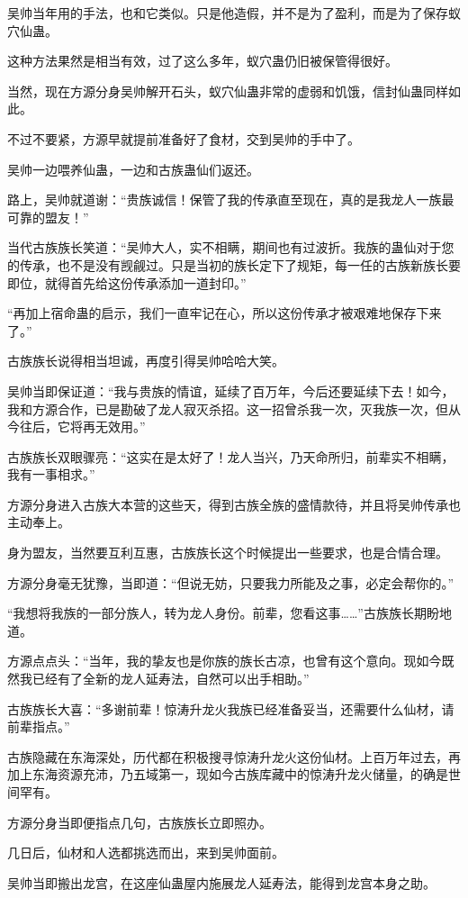 \begin{this_body}
吴帅当年用的手法，也和它类似。只是他造假，并不是为了盈利，而是为了保存蚁穴仙蛊。

这种方法果然是相当有效，过了这么多年，蚁穴蛊仍旧被保管得很好。

当然，现在方源分身吴帅解开石头，蚁穴仙蛊非常的虚弱和饥饿，信封仙蛊同样如此。

不过不要紧，方源早就提前准备好了食材，交到吴帅的手中了。

吴帅一边喂养仙蛊，一边和古族蛊仙们返还。

路上，吴帅就道谢：“贵族诚信！保管了我的传承直至现在，真的是我龙人一族最可靠的盟友！”

当代古族族长笑道：“吴帅大人，实不相瞒，期间也有过波折。我族的蛊仙对于您的传承，也不是没有觊觎过。只是当初的族长定下了规矩，每一任的古族新族长要即位，就得首先给这份传承添加一道封印。”

“再加上宿命蛊的启示，我们一直牢记在心，所以这份传承才被艰难地保存下来了。”

古族族长说得相当坦诚，再度引得吴帅哈哈大笑。

吴帅当即保证道：“我与贵族的情谊，延续了百万年，今后还要延续下去！如今，我和方源合作，已是勘破了龙人寂灭杀招。这一招曾杀我一次，灭我族一次，但从今往后，它将再无效用。”

古族族长双眼骤亮：“这实在是太好了！龙人当兴，乃天命所归，前辈实不相瞒，我有一事相求。”

方源分身进入古族大本营的这些天，得到古族全族的盛情款待，并且将吴帅传承也主动奉上。

身为盟友，当然要互利互惠，古族族长这个时候提出一些要求，也是合情合理。

方源分身毫无犹豫，当即道：“但说无妨，只要我力所能及之事，必定会帮你的。”

“我想将我族的一部分族人，转为龙人身份。前辈，您看这事……”古族族长期盼地道。

方源点点头：“当年，我的挚友也是你族的族长古凉，也曾有这个意向。现如今既然我已经有了全新的龙人延寿法，自然可以出手相助。”

古族族长大喜：“多谢前辈！惊涛升龙火我族已经准备妥当，还需要什么仙材，请前辈指点。”

古族隐藏在东海深处，历代都在积极搜寻惊涛升龙火这份仙材。上百万年过去，再加上东海资源充沛，乃五域第一，现如今古族库藏中的惊涛升龙火储量，的确是世间罕有。

方源分身当即便指点几句，古族族长立即照办。

几日后，仙材和人选都挑选而出，来到吴帅面前。

吴帅当即搬出龙宫，在这座仙蛊屋内施展龙人延寿法，能得到龙宫本身之助。


\end{this_body}
